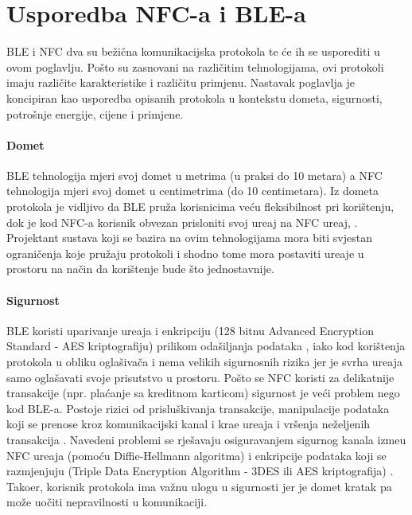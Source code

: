 


\chapter{Usporedba NFC-a i BLE-a}


BLE i NFC dva su be\v{z}i\v{c}na komunikacijska protokola te \'{c}e ih se usporediti u ovom poglavlju. Po\v{s}to su zasnovani na razli\v{c}itim tehnologijama, ovi protokoli imaju razli\v{c}ite karakteristike i razli\v{c}itu primjenu. 
Nastavak poglavlja je koncipiran kao usporedba opisanih protokola u kontekstu dometa, sigurnosti, potro\v{s}nje energije, cijene i primjene. 

\subsubsection{Domet}

BLE tehnologija mjeri svoj domet u metrima (u praksi do 10 metara) a NFC tehnologija mjeri svoj domet u centimetrima (do 10 centimetara). Iz dometa protokola je vidljivo da BLE pru\v{z}a korisnicima ve\'{c}u fleksibilnost pri kori\v{s}tenju, dok je kod NFC-a korisnik obvezan prisloniti svoj ure\dj aj na NFC ure\dj aj, . Projektant sustava koji se bazira na ovim tehnologijama mora biti svjestan ograni\v{c}enja koje pru\v{z}aju protokoli i shodno tome mora postaviti ure\dj aje u prostoru na na\v{c}in da kori\v{s}tenje bude \v{s}to jednostavnije.

\subsubsection{Sigurnost}

BLE koristi uparivanje ure\dj aja i enkripciju (128 bitnu Advanced Encryption Standard - AES kriptografiju) prilikom oda\v{s}iljanja podataka  \cite{bleSecurity}, iako kod kori\v{s}tenja protokola u obliku ogla\v{s}iva\v{c}a i nema velikih sigurnosnih rizika jer je svrha ure\dj aja samo ogla\v{s}avati svoje prisutstvo u prostoru. Po\v{s}to se NFC koristi za delikatnije transakcije (npr. pla\'{c}anje sa kreditnom karticom) sigurnost je ve\'{c}i problem nego kod BLE-a. Postoje rizici od prislu\v{s}kivanja transakcije, manipulacije podataka koji se prenose kroz komunikacijski kanal i kra\dj e ure\dj aja i vr\v{s}enja ne\v{z}eljenih transakcija \cite{nfcSecurity}. Navedeni problemi se rje\v{s}avaju osiguravanjem sigurnog kanala izme\dj u NFC ure\dj aja (pomo\'{c}u Diffie-Hellmann algoritma) i enkripcije podataka koji se razmjenjuju (Triple Data Encryption Algorithm - 3DES ili AES kriptografija) \cite{nfcSecurityTwo}. Tako\dj er, korisnik protokola ima va\v{z}nu ulogu u sigurnosti jer je domet kratak pa mo\v{z}e uo\v{c}iti nepravilnosti u komunikaciji.

